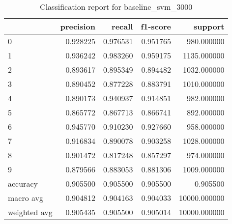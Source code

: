 \begin{table}[htb!]
\centering
\caption{Classification report for baseline_svm_3000}
\label{tab:classification-report-baseline_svm_3000}
\begin{tabular}{lrrrr}
\toprule
 & precision & recall & f1-score & support \\
\midrule
0 & 0.928225 & 0.976531 & 0.951765 & 980.000000 \\
1 & 0.936242 & 0.983260 & 0.959175 & 1135.000000 \\
2 & 0.893617 & 0.895349 & 0.894482 & 1032.000000 \\
3 & 0.890452 & 0.877228 & 0.883791 & 1010.000000 \\
4 & 0.890173 & 0.940937 & 0.914851 & 982.000000 \\
5 & 0.865772 & 0.867713 & 0.866741 & 892.000000 \\
6 & 0.945770 & 0.910230 & 0.927660 & 958.000000 \\
7 & 0.916834 & 0.890078 & 0.903258 & 1028.000000 \\
8 & 0.901472 & 0.817248 & 0.857297 & 974.000000 \\
9 & 0.879566 & 0.883053 & 0.881306 & 1009.000000 \\
accuracy & 0.905500 & 0.905500 & 0.905500 & 0.905500 \\
macro avg & 0.904812 & 0.904163 & 0.904033 & 10000.000000 \\
weighted avg & 0.905435 & 0.905500 & 0.905014 & 10000.000000 \\
\bottomrule
\end{tabular}
\end{table}
